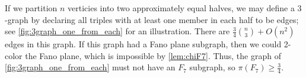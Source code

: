 If we partition $n$ verticies into two approximately equal halves, we may define a $3$-graph by declaring all triples with at least one member in each half to be edges; see \cref{fig:3graph_one_from_each} for an illustration.
There are $\frac{3}{4}{n\choose 3} + O(n^2)$ edges in this graph. If this graph had a Fano plane subgraph, then we could 2-color the Fano plane, which is impossible by \cref{lem:chiF7}. Thus, the graph of \cref{fig:3graph_one_from_each} must not have an $F_7$ subgraph, so $\pi(F_7)\geq \frac{3}{4}$.


